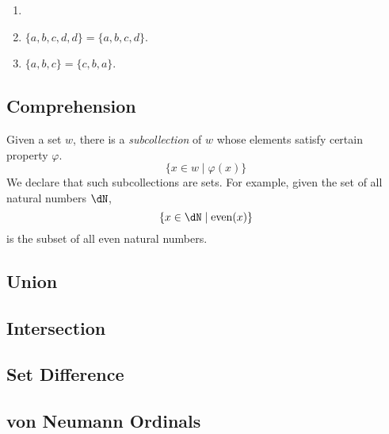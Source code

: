 \documentclass{amsart}
\begin{document}
\begin{eg}
  \begin{enumerate}
  \item[]
  \item $\{a,b,c,d,d\} = \{a,b,c,d\}$.
  \item $\{a,b,c\} = \{c,b,a\}$.
  \end{enumerate}
\end{eg}

\subsection{Comprehension}
\label{sec:comprehension}

Given a set $w$, there is a \emph{subcollection} of $w$ whose elements satisfy certain property $\varphi$.
\[
  \{ x \in w \mid \varphi(x) \}
\]
We declare that such subcollections are sets.
For example, given the set of all natural numbers $\dN$,
\[
  \{ x \in \dN \mid \mathrm{even}(x) \}
\]
is the subset of all even natural numbers.

\subsection{Union}
\label{sec:union}

\subsection{Intersection}
\label{sec:intersection}

\subsection{Set Difference}
\label{sec:set-difference}



\subsection{von Neumann Ordinals}
\label{sec:von-neumann-ordinals}
\end{document}
